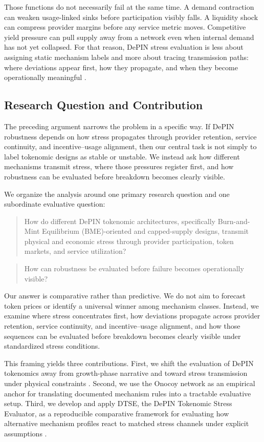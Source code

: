 Those functions do not necessarily fail at the same time. A demand contraction can weaken usage-linked sinks before participation visibly falls. A liquidity shock can compress provider margins before any service metric moves. Competitive yield pressure can pull supply away from a network even when internal demand has not yet collapsed. For that reason, DePIN stress evaluation is less about assigning static mechanism labels and more about tracing transmission paths: where deviations appear first, how they propagate, and when they become operationally meaningful \cite{Morris2019, Braakman2022}.

\subsection{Research Question and Contribution}
\label{subsec:research_question}
The preceding argument narrows the problem in a specific way. If DePIN robustness depends on how stress propagates through provider retention, service continuity, and incentive--usage alignment, then our central task is not simply to label tokenomic designs as stable or unstable. We instead ask how different mechanisms transmit stress, where those pressures register first, and how robustness can be evaluated before breakdown becomes clearly visible.

We organize the analysis around one primary research question and one subordinate evaluative question:

\begin{quote}
How do different DePIN tokenomic architectures, specifically Burn-and-Mint Equilibrium (BME)-oriented and capped-supply designs, transmit physical and economic stress through provider participation, token markets, and service utilization?
\end{quote}

\begin{quote}
How can robustness be evaluated before failure becomes operationally visible?
\end{quote}

Our answer is comparative rather than predictive. We do not aim to forecast token prices or identify a universal winner among mechanism classes. Instead, we examine where stress concentrates first, how deviations propagate across provider retention, service continuity, and incentive--usage alignment, and how those sequences can be evaluated before breakdown becomes clearly visible under standardized stress conditions.

This framing yields three contributions. First, we shift the evaluation of DePIN tokenomics away from growth-phase narrative and toward stress transmission under physical constraints \cite{Ballandies2023, Lin2024}. Second, we use the Onocoy network as an empirical anchor for translating documented mechanism rules into a tractable evaluative setup. Third, we develop and apply DTSE, the DePIN Tokenomic Stress Evaluator, as a reproducible comparative framework for evaluating how alternative mechanism profiles react to matched stress channels under explicit assumptions \cite{Morris2019, Braakman2022}.

